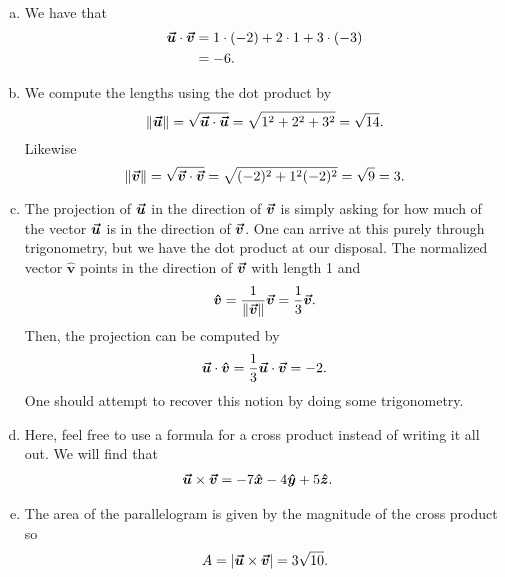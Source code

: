 \documentclass[12pt]{article} %
\newcommand{\vhat}{\boldsymbol{\hat{v}}}
\begin{document}
\begin{solution}~
\begin{enumerate}[(a)]
    \item We have that
    \begin{align*}
        \boldsymbol{\vec{u}} \cdot \boldsymbol{\vec{v}} &= 1\cdot (-2) + 2 \cdot 1 + 3 \cdot (-3)\\
        &= -6.
    \end{align*}
    \item We compute the lengths using the dot product by
    \[
        \|\boldsymbol{\vec{u}}\| = \sqrt{\boldsymbol{\vec{u}} \cdot \boldsymbol{\vec{u}}} = \sqrt{1^2+2^2+3^2} = \sqrt{14}.
    \]
    Likewise
    \[
        \|\boldsymbol{\vec{v}}\| = \sqrt{\boldsymbol{\vec{v}} \cdot \boldsymbol{\vec{v}}} = \sqrt{(-2)^2 + 1^2 (-2)^2} = \sqrt{9} = 3.
    \]

    \item The projection of $\boldsymbol{\vec{u}}$ in the direction of $\boldsymbol{\vec{v}}$ is simply asking for how much of the vector $\boldsymbol{\vec{u}}$ is in the direction of $\boldsymbol{\vec{v}}$.  One can arrive at this purely through trigonometry, but we have the dot product at our disposal.  The normalized vector $\vhat$ points in the direction of $\boldsymbol{\vec{v}}$ with length 1 and
    \[
        \vhat = \frac{1}{\|\vecv\|} \vecv = \frac{1}{3} \vecv.
    \]
    Then, the projection can be computed by
    \[
        \vecu \cdot \vhat = \frac{1}{3} \vecu \cdot \vecv = -2.
    \]
    One should attempt to recover this notion by doing some trigonometry.
 \item Here, feel free to use a formula for a cross product instead of writing it all out.  We will find that
    \begin{align*}
        \boldsymbol{\vec{u}} \times \boldsymbol{\vec{v}} &= -7\boldsymbol{\hat{x}} -4\boldsymbol{\hat{y}} +5\boldsymbol{\hat{z}}.
    \end{align*}
        \item The area of the parallelogram is given by the magnitude of the cross product so
    \[
    A = | \boldsymbol{\vec{u}} \times \boldsymbol{\vec{v}} | = 3\sqrt{10}.
    \]

\end{enumerate}
\end{solution}
\end{document}
